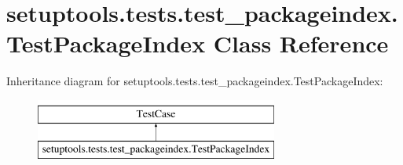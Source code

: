 \hypertarget{classsetuptools_1_1tests_1_1test__packageindex_1_1TestPackageIndex}{}\section{setuptools.\+tests.\+test\+\_\+packageindex.\+Test\+Package\+Index Class Reference}
\label{classsetuptools_1_1tests_1_1test__packageindex_1_1TestPackageIndex}
Inheritance diagram for setuptools.\+tests.\+test\+\_\+packageindex.\+Test\+Package\+Index\+:\begin{figure}[H]
\begin{center}
\leavevmode
\includegraphics[height=2.000000cm]{classsetuptools_1_1tests_1_1test__packageindex_1_1TestPackageIndex}
\end{center}
\end{figure}
